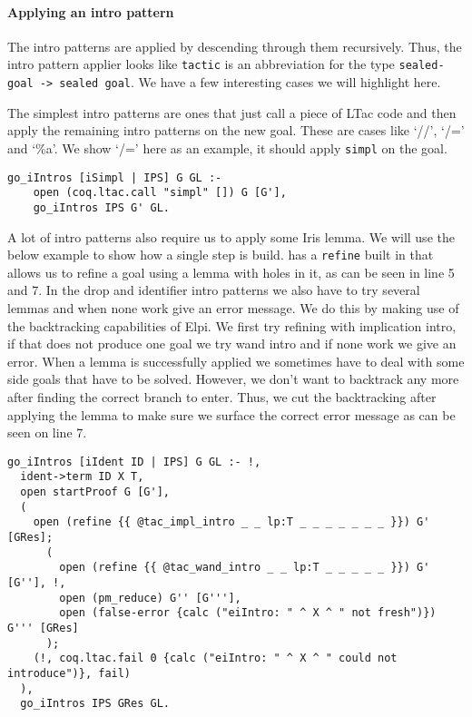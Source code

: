 \documentclass[thesis.tex]{subfiles}
\begin{document}
{{{\paragraph*{Applying an intro pattern}
The intro patterns are applied by descending through them recursively. Thus, the intro pattern applier looks like  \texttt{tactic} is an abbreviation for the type \texttt{sealed-goal -> sealed goal}. We have a few interesting cases we will highlight here.

The simplest intro patterns are ones that just call a piece of LTac code and then apply the remaining intro patterns on the new goal. These are cases like `//', `/=' and `\%a'. We show `/=' here as an example, it should apply \texttt{simpl} on the goal.
\begin{verbatim}
go_iIntros [iSimpl | IPS] G GL :-
    open (coq.ltac.call "simpl" []) G [G'],
    go_iIntros IPS G' GL.
\end{verbatim}

A lot of intro patterns also require us to apply some Iris lemma. We will use the below example to show how a single step is build. \ce has a \texttt{refine} built in that allows us to refine a goal using a lemma with holes in it, as can be seen in line 5 and 7. In the drop and identifier intro patterns we also have to try several lemmas and when none work give an error message. We do this by making use of the backtracking capabilities of Elpi. We first try refining with implication intro, if that does not produce one goal we try wand intro and if none work we give an error. When a lemma is successfully applied we sometimes have to deal with some side goals that have to be solved. However, we don't want to backtrack any more after finding the correct branch to enter. Thus, we cut the backtracking after applying the lemma to make sure we surface the correct error message as can be seen on line 7.
\begin{verbatim}
go_iIntros [iIdent ID | IPS] G GL :- !,
  ident->term ID X T,
  open startProof G [G'],
  (
    open (refine {{ @tac_impl_intro _ _ lp:T _ _ _ _ _ _ _ }}) G' [GRes];
      (
        open (refine {{ @tac_wand_intro _ _ lp:T _ _ _ _ _ }}) G' [G''], !,
        open (pm_reduce) G'' [G'''],
        open (false-error {calc ("eiIntro: " ^ X ^ " not fresh")}) G''' [GRes]
      );
    (!, coq.ltac.fail 0 {calc ("eiIntro: " ^ X ^ " could not introduce")}, fail)
  ),
  go_iIntros IPS GRes GL.
\end{verbatim}

}}}
\end{document}
